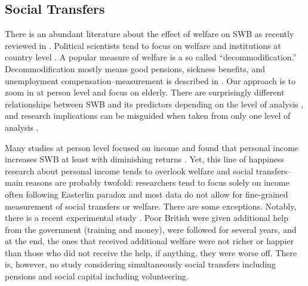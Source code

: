 \documentclass[10pt, letterpaper]{article}
\begin{document}
\begin{spacing}{1.4}
\section{Social Transfers}

There is an abundant literature about the effect of welfare on SWB as recently
reviewed in \citet{aokJap14}. {Political scientists tend to focus on welfare and institutions at country
level \citep{alvarez09,pacek08b,radcliff13,pacek08r,radcliff01,bok10}. A popular
measure of welfare is a so called ``decommodification.'' %
Decommodification mostly means good pensions, sickness benefits,
and unemployment compensation--measurement is described in  \citet{scruggs06Ba}. Our approach is to zoom
in at person level and focus on elderly.} %
%
 There are surprisingly different relationships between SWB and its predictors
 depending on the level of analysis \citep{ashkanasy11}, and research implications can be
misguided when taken from only one level of analysis \citep{klein00}.

Many studies at person level focused on income and found that 
personal  income  increases SWB at least with diminishing returns
\citep{aok_ruut_inc_ine,kahneman10,frijters04,kushlev15,dolan08al,veenhoven12}. Yet,
this line of happiness research about personal income tends to overlook welfare
and social transfers--main reasons are probably twofold: researchers tend to
focus solely on income often following Easterlin paradox \citep{easterlin10B} and most data do
not allow for fine-grained measurement of social transfers or welfare. 
%
There are some exceptions. Notably, there is a recent experimental study \citep{oswald14}. Poor British
were given additional help from the government (training and money),  
were followed for several years, and at the end, the ones that received
additional welfare were not richer or happier than those who did not receive the
 help, if anything, they
were worse off. There is, however, no study considering simultaneously social transfers
including pensions and social capital including volunteering.


\end{spacing}
\end{document}
